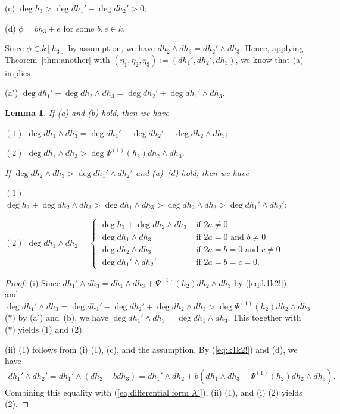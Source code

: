\documentclass{amsart}
\theoremstyle{plain}
\newtheorem{lem}[thm]{Lemma}
\theoremstyle{definition}
\newcommand{\nd}{\noindent}
\begin{document}
\smallskip 

(c) $\deg h_3>\deg dh_1'-\deg dh_2'>0$; 

\smallskip 

(d) $\phi =bh_3+e$ for some $b,e\in k$. 

\smallskip 


\nd 
Since $\phi \in k[h_3]$ by assumption, 
we have $dh_2\wedge dh_3=dh_2'\wedge dh_3$. 
Hence, 
applying Theorem~\ref{thm:another} 
with $(\eta _1,\eta _2,\eta _3):=(dh_1',dh_2',dh_3)$, 
we know that (a) implies 


\smallskip 


(a$'$) 
$\deg dh_1'+\deg dh_2\wedge dh_3
=\deg dh_2'+\deg dh_1'\wedge dh_3$. 


\begin{lem}\label{lem:determinant}
\nd{\rm (i)} 
If {\rm (a)} and {\rm (b)} hold, 
then we have 


$(1)$ 
$\deg dh_1\wedge dh_3=\deg dh_1'-\deg dh_2'+\deg dh_2\wedge dh_3;$ 


$(2)$ $\deg dh_1\wedge dh_3>\deg \Psi ^{(1)}(h_2)dh_2\wedge dh_3$. 



\nd{\rm (ii)} 
If $\deg dh_2\wedge dh_3>\deg dh_1'\wedge dh_2'$ 
and {\rm (a)}--{\rm (d)} hold, 
then we have 


$(1)$ $\deg h_3+\deg dh_2\wedge dh_3
>\deg dh_1\wedge dh_3 
>\deg dh_2\wedge dh_3>\deg dh_1'\wedge dh_2';$ 



$(2)$ 
$\deg dh_1\wedge dh_2=\left\{
\begin{array}{cl}
\deg h_3+\deg dh_2\wedge dh_3 & \text{ if }2a\neq 0 \\
\deg dh_1\wedge dh_3 & \text{ if }2a=0\text{ and }b\neq 0 \\
\deg dh_2\wedge dh_3 & \text{ if }2a=b=0
\text{ and }c\neq 0 \\
\deg dh_1'\wedge dh_2' & \text{ if }2a=b=c=0 .
\end{array}
\right. $





\end{lem}
\begin{proof}
(i) Since 
$dh_1'\wedge dh_3=dh_1\wedge dh_3+\Psi ^{(1)}(h_2)dh_2\wedge dh_3$ 
by (\ref{eq:k1k2!}), 
and $\deg dh_1'\wedge dh_3 
=\deg dh_1'-\deg dh_2'+\deg dh_2\wedge dh_3 
>\deg \Psi ^{(1)}(h_2)dh_2\wedge dh_3$ ($*$) 
by (a$'$) and~(b), 
we have 
$\deg dh_1'\wedge dh_3=\deg dh_1\wedge dh_3$. 
This together with ($*$) yields (1) and (2). 




(ii) 
(1) follows from 
(i) (1), (c), and the assumption. 
By (\ref{eq:k1k2!}) and (d), we have
\begin{align*}
dh_1'\wedge dh_2'
=dh_1'\wedge (dh_2+bdh_3)
=dh_1'\wedge dh_2
+b(dh_1\wedge dh_3+\Psi ^{(1)}(h_2)dh_2\wedge dh_3). 
\end{align*}
Combining this equality with (\ref{eq:differential form A'}), 
(ii) (1), and (i) (2) yields (2). 
\end{proof}
\end{document}
